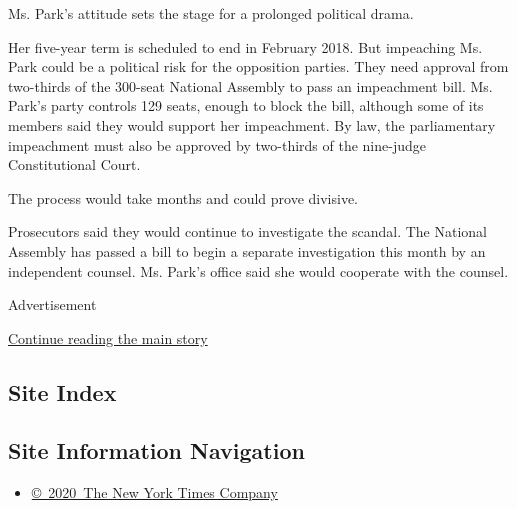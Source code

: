Ms. Park's attitude sets the stage for a prolonged political drama.

Her five-year term is scheduled to end in February 2018. But impeaching
Ms. Park could be a political risk for the opposition parties. They need
approval from two-thirds of the 300-seat National Assembly to pass an
impeachment bill. Ms. Park's party controls 129 seats, enough to block
the bill, although some of its members said they would support her
impeachment. By law, the parliamentary impeachment must also be approved
by two-thirds of the nine-judge Constitutional Court.

The process would take months and could prove divisive.

Prosecutors said they would continue to investigate the scandal. The
National Assembly has passed a bill to begin a separate investigation
this month by an independent counsel. Ms. Park's office said she would
cooperate with the counsel.

Advertisement

\protect\hyperlink{after-bottom}{Continue reading the main story}

\hypertarget{site-index}{%
\subsection{Site Index}\label{site-index}}

\hypertarget{site-information-navigation}{%
\subsection{Site Information
Navigation}\label{site-information-navigation}}

\begin{itemize}
\tightlist
\item
  \href{https://help.nytimes.com/hc/en-us/articles/115014792127-Copyright-notice}{©~2020~The
  New York Times Company}
\end{itemize}

